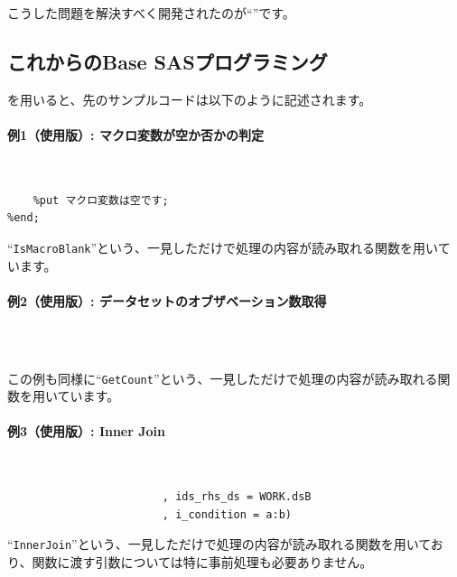 こうした問題を解決すべく開発されたのが``{\bfseries \RDM}''です。
 
\subsection{これからのBase SASプログラミング}
\RDM を用いると、先のサンプルコードは以下のように記述されます。
\paragraph{例1（\RDM 使用版）: マクロ変数が空か否かの判定}\mbox{}\\
\begin{lstlisting}[language=SAS, caption={マクロ変数が空か否かの判定}, label={code:is_macro_blank_new}, breaklines = true]
%if (%&RSUUtil.IsMacroBlank(_my_macro)) %then %do;
	%put マクロ変数は空です;
%end;
\end{lstlisting}
``\texttt{IsMacroBlank}''という、一見しただけで処理の内容が読み取れる関数を用いています。
 
\paragraph{例2（\RDM 使用版）: データセットのオブザベーション数取得}\mbox{}\\
\begin{lstlisting}[language=SAS, caption={データセットのオブザベーション数取得}, label={code:get_count_new}, breaklines = true]
%put %&RSUDS.GetCount(WORK.dsA);
\end{lstlisting}
この例も同様に``\texttt{GetCount}''という、一見しただけで処理の内容が読み取れる関数を用いています。
 
\paragraph{例3（\RDM 使用版）: Inner Join}\mbox{}\\
\begin{lstlisting}[language=SAS, caption={データセットのInner Join}, label={code:inner_join_new}, breaklines = true]
%&RSUDS.InnerJoin(ids_lhs_ds = WORK.dsA
						, ids_rhs_ds = WORK.dsB
						, i_condition = a:b)
\end{lstlisting}
``\texttt{InnerJoin}''という、一見しただけで処理の内容が読み取れる関数を用いており、関数に渡す引数については特に事前処理も必要ありません。
 
 
\section{\DocStrTitleRDMRaisonDetre}
